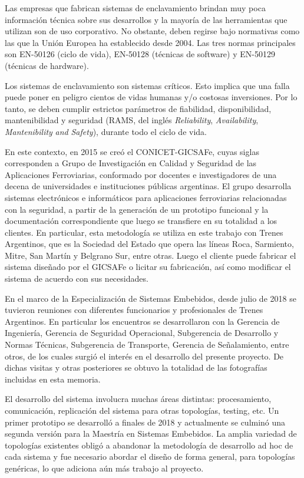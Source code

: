 		Las empresas que fabrican sistemas de enclavamiento brindan muy poca información técnica sobre sus desarrollos y la mayoría de las herramientas que utilizan son de uso corporativo. No obstante, deben regirse bajo normativas como las que la Unión Europea ha establecido desde 2004. Las tres normas principales son EN-50126\citep{EN50126} (ciclo de vida), EN-50128\citep{EN50128} (técnicas de software) y EN-50129\citep{EN50129} (técnicas de hardware). %
		
		Los sistemas de enclavamiento son sistemas críticos. Esto implica que una falla puede poner en peligro cientos de vidas humanas y/o costosas inversiones. Por lo tanto, se deben cumplir estrictos parámetros de fiabilidad, disponibilidad, mantenibilidad y seguridad (RAMS, del inglés \textit{Reliability}, \textit{Availability}, \textit{Mantenibility} \textit{and} \textit{Safety}), durante todo el ciclo de vida.
		
		En este contexto, en 2015 se creó el CONICET-GICSAFe, cuyas siglas corresponden a Grupo de Investigación en Calidad y Seguridad de las Aplicaciones Ferroviarias, conformado por docentes e investigadores de una decena de universidades e instituciones públicas argentinas\citep{GICSAFE}. El grupo desarrolla sistemas electrónicos e informáticos para aplicaciones ferroviarias relacionadas con la seguridad, a partir de la generación de un prototipo funcional y la documentación correspondiente que luego se transfiere en su totalidad a los clientes. En particular, esta metodología se utiliza en este trabajo con Trenes Argentinos, que es la Sociedad del Estado que opera las líneas Roca, Sarmiento, Mitre, San Martín y Belgrano Sur, entre otras. Luego el cliente puede fabricar el sistema diseñado por el GICSAFe o licitar su fabricación, así como modificar el sistema de acuerdo con sus necesidades.   
	
		En el marco de la Especialización de Sistemas Embebidos, desde julio de 2018 se tuvieron reuniones con diferentes funcionarios y profesionales de Trenes Argentinos. En particular los encuentros se desarrollaron con la Gerencia de Ingeniería, Gerencia de Seguridad Operacional, Subgerencia de Desarrollo y Normas Técnicas, Subgerencia de Transporte, Gerencia de Señalamiento, entre otros, de los cuales surgió el interés en el desarrollo del presente proyecto. De dichas visitas y otras posteriores se obtuvo la totalidad de las fotografías incluidas en esta memoria.
			 	
		El desarrollo del sistema involucra muchas áreas distintas: procesamiento, comunicación, replicación del sistema para otras topologías, testing, etc. Un primer prototipo se desarrolló a finales de 2018 y actualmente se culminó una segunda versión para la Maestría en Sistemas Embebidos. La amplia variedad de topologías existentes obligó a abandonar la metodología de desarrollo ad hoc de cada sistema y fue necesario abordar el diseño de forma general, para topologías genéricas, lo que adiciona aún más trabajo al proyecto.		
		
